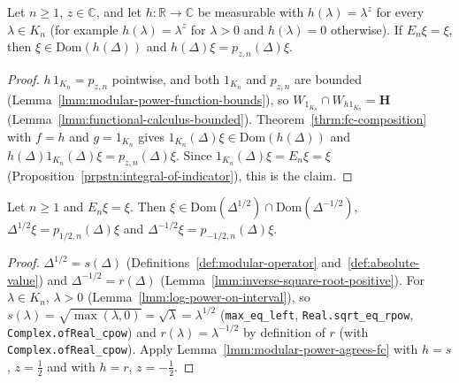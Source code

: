 \begin{lemma}
    \label{lmm:modular-power-agrees-fc}
    \leanok
    Let $n \ge 1$, $z \in \mathbb{C}$, and let $h : \mathbb{R} \to \mathbb{C}$ be measurable with $h(\lambda) = \lambda^z$ for every $\lambda \in K_n$ (for example $h(\lambda) = \lambda^z$ for $\lambda > 0$ and $h(\lambda) = 0$ otherwise). If $E_n\xi = \xi$, then $\xi \in \text{Dom}(h(\Delta))$ and $h(\Delta)\xi = p_{z,n}(\Delta)\xi$.
\end{lemma}
\begin{proof}
    \leanok
    $h\,1_{K_n} = p_{z,n}$ pointwise, and both $1_{K_n}$ and $p_{z,n}$ are bounded (Lemma~\ref{lmm:modular-power-function-bounds}), so $W_{1_{K_n}} \cap W_{h1_{K_n}} = \mathbf{H}$ (Lemma~\ref{lmm:functional-calculus-bounded}). Theorem~\ref{thrm:fc-composition} with $f = h$ and $g = 1_{K_n}$ gives $1_{K_n}(\Delta)\xi \in \text{Dom}(h(\Delta))$ and $h(\Delta)1_{K_n}(\Delta)\xi = p_{z,n}(\Delta)\xi$. Since $1_{K_n}(\Delta)\xi = E_n\xi = \xi$ (Proposition~\ref{prpstn:integral-of-indicator}), this is the claim.
\end{proof}

\begin{lemma}
    \label{lmm:modular-power-half}
    \leanok
    Let $n \ge 1$ and $E_n\xi = \xi$. Then $\xi \in \text{Dom}(\Delta^{1/2}) \cap \text{Dom}(\Delta^{-1/2})$, $\Delta^{1/2}\xi = p_{1/2,n}(\Delta)\xi$ and $\Delta^{-1/2}\xi = p_{-1/2,n}(\Delta)\xi$.
\end{lemma}
\begin{proof}
    \leanok
    $\Delta^{1/2} = s(\Delta)$ (Definitions~\ref{def:modular-operator} and~\ref{def:absolute-value}) and $\Delta^{-1/2} = r(\Delta)$ (Lemma~\ref{lmm:inverse-square-root-positive}). For $\lambda \in K_n$, $\lambda > 0$ (Lemma~\ref{lmm:log-power-on-interval}), so $s(\lambda) = \sqrt{\max(\lambda, 0)} = \sqrt{\lambda} = \lambda^{1/2}$ (\texttt{max\_eq\_left}, \texttt{Real.sqrt\_eq\_rpow}, \texttt{Complex.ofReal\_cpow}) and $r(\lambda) = \lambda^{-1/2}$ by definition of $r$ (with \texttt{Complex.ofReal\_cpow}). Apply Lemma~\ref{lmm:modular-power-agrees-fc} with $h = s$, $z = \tfrac{1}{2}$ and with $h = r$, $z = -\tfrac{1}{2}$.
\end{proof}

